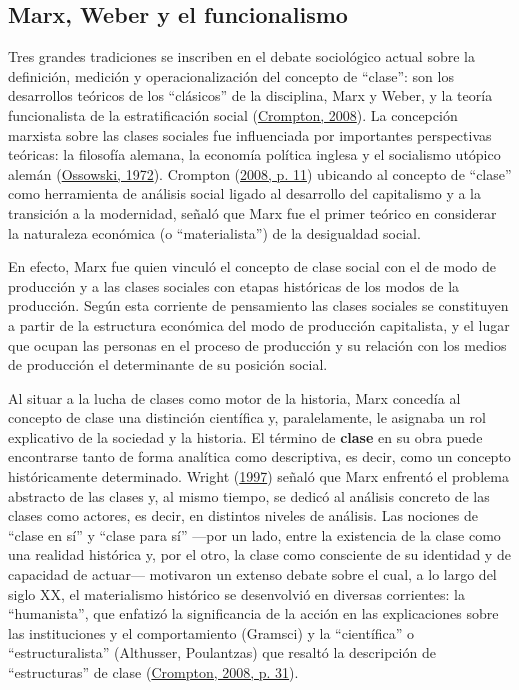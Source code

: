 \documentclass[
]{article}
\begin{document}
\hypertarget{marx}{%
\subsection{Marx, Weber y el funcionalismo}\label{marx}}

Tres grandes tradiciones se inscriben en el debate sociológico actual sobre la definición, medición y operacionalización del concepto de ``clase'': son los desarrollos teóricos de los ``clásicos'' de la disciplina, Marx y Weber, y la teoría funcionalista de la estratificación social (\protect\hyperlink{ref-Crompton2008}{Crompton, 2008}). La concepción marxista sobre las clases sociales fue influenciada por importantes perspectivas teóricas: la filosofía alemana, la economía política inglesa y el socialismo utópico alemán (\protect\hyperlink{ref-Ossowski1972}{Ossowski, 1972}). Crompton (\protect\hyperlink{ref-Crompton2008}{2008, p. 11}) ubicando al concepto de ``clase'' como herramienta de análisis social ligado al desarrollo del capitalismo y a la transición a la modernidad, señaló que Marx fue el primer teórico en considerar la naturaleza económica (o ``materialista'') de la desigualdad social.

En efecto, Marx fue quien vinculó el concepto de clase social con el de modo de producción y a las clases sociales con etapas históricas de los modos de la producción. Según esta corriente de pensamiento las clases sociales se constituyen a partir de la estructura económica del modo de producción capitalista, y el lugar que ocupan las personas en el proceso de producción y su relación con los medios de producción el determinante de su posición social.

Al situar a la lucha de clases como motor de la historia, Marx concedía al concepto de clase una distinción científica y, paralelamente, le asignaba un rol explicativo de la sociedad y la historia. El término de \textbf{clase} en su obra puede encontrarse tanto de forma analítica como descriptiva, es decir, como un concepto históricamente determinado. Wright (\protect\hyperlink{ref-Wright1997}{1997}) señaló que Marx enfrentó el problema abstracto de las clases y, al mismo tiempo, se dedicó al análisis concreto de las clases como actores, es decir, en distintos niveles de análisis. Las nociones de ``clase en sí'' y ``clase para sí'' ---por un lado, entre la existencia de la clase como una realidad histórica y, por el otro, la clase como consciente de su identidad y de capacidad de actuar--- motivaron un extenso debate sobre el cual, a lo largo del siglo XX, el materialismo histórico se desenvolvió en diversas corrientes: la ``humanista'', que enfatizó la significancia de la acción en las explicaciones sobre las instituciones y el comportamiento (Gramsci) y la ``científica'' o ``estructuralista'' (Althusser, Poulantzas) que resaltó la descripción de ``estructuras'' de clase (\protect\hyperlink{ref-Crompton2008}{Crompton, 2008, p. 31}).
\end{document}
